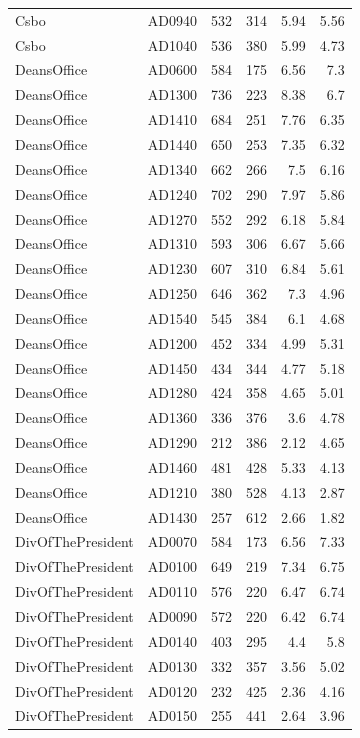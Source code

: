 \documentclass[article,10pt,microtype]{article}
\begin{document}
\begin{longtable}{llrrrr}
Csbo & AD0940 & 532 & 314 & 5.94 & 5.56\\
Csbo & AD1040 & 536 & 380 & 5.99 & 4.73\\
DeansOffice & AD0600 & 584 & 175 & 6.56 & 7.3\\
DeansOffice & AD1300 & 736 & 223 & 8.38 & 6.7\\
DeansOffice & AD1410 & 684 & 251 & 7.76 & 6.35\\
DeansOffice & AD1440 & 650 & 253 & 7.35 & 6.32\\
DeansOffice & AD1340 & 662 & 266 & 7.5 & 6.16\\
DeansOffice & AD1240 & 702 & 290 & 7.97 & 5.86\\
DeansOffice & AD1270 & 552 & 292 & 6.18 & 5.84\\
DeansOffice & AD1310 & 593 & 306 & 6.67 & 5.66\\
DeansOffice & AD1230 & 607 & 310 & 6.84 & 5.61\\
DeansOffice & AD1250 & 646 & 362 & 7.3 & 4.96\\
DeansOffice & AD1540 & 545 & 384 & 6.1 & 4.68\\
DeansOffice & AD1200 & 452 & 334 & 4.99 & 5.31\\
DeansOffice & AD1450 & 434 & 344 & 4.77 & 5.18\\
DeansOffice & AD1280 & 424 & 358 & 4.65 & 5.01\\
DeansOffice & AD1360 & 336 & 376 & 3.6 & 4.78\\
DeansOffice & AD1290 & 212 & 386 & 2.12 & 4.65\\
DeansOffice & AD1460 & 481 & 428 & 5.33 & 4.13\\
DeansOffice & AD1210 & 380 & 528 & 4.13 & 2.87\\
DeansOffice & AD1430 & 257 & 612 & 2.66 & 1.82\\
DivOfThePresident & AD0070 & 584 & 173 & 6.56 & 7.33\\
DivOfThePresident & AD0100 & 649 & 219 & 7.34 & 6.75\\
DivOfThePresident & AD0110 & 576 & 220 & 6.47 & 6.74\\
DivOfThePresident & AD0090 & 572 & 220 & 6.42 & 6.74\\
DivOfThePresident & AD0140 & 403 & 295 & 4.4 & 5.8\\
DivOfThePresident & AD0130 & 332 & 357 & 3.56 & 5.02\\
DivOfThePresident & AD0120 & 232 & 425 & 2.36 & 4.16\\
DivOfThePresident & AD0150 & 255 & 441 & 2.64 & 3.96\\

\end{longtable}
\end{document}
